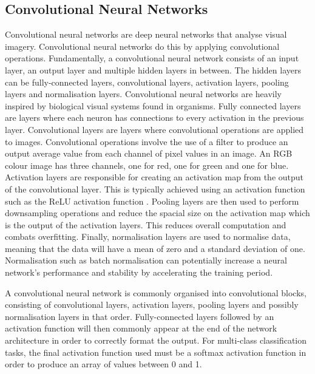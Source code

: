 \documentclass{l4proj}
\begin{document}
\subsection{Convolutional Neural Networks}
Convolutional neural networks are deep neural networks that analyse visual imagery.
Convolutional neural networks do this by applying convolutional operations.
Fundamentally, a convolutional neural network consists of an input layer, an output layer and multiple hidden layers in between.
The hidden layers can be fully-connected layers, convolutional layers, activation layers, pooling layers and normalisation layers.
Convolutional neural networks are heavily inspired by biological visual systems found in organisms.
Fully connected layers are layers where each neuron has connections to every activation in the previous layer.
Convolutional layers are layers where convolutional operations are applied to images.
Convolutional operations involve the use of a filter to produce an output average value from each channel of pixel values in an image.
An RGB colour image has three channels, one for red, one for green and one for blue.
Activation layers are responsible for creating an activation map from the output of the convolutional layer.
This is typically achieved using an activation function such as the ReLU activation function \cite{Nair:2010:RLU:3104322.3104425}. 
Pooling layers are then used to perform downsampling operations and reduce the spacial size on the activation map which is the output of the activation layers.
This reduces overall computation and combats overfitting.
Finally, normalisation layers are used to normalise data, meaning that the data will have a mean of zero and a standard deviation of one.
Normalisation such as batch normalisation\cite{Ioffe:2015:BNA:3045118.3045167} can potentially increase a neural network's performance and stability by accelerating the training period.

A convolutional neural network is commonly organised into convolutional blocks, consisting of convolutional layers, activation layers, pooling layers and possibly normalisation layers in that order. 
Fully-connected layers followed by an activation function will then commonly appear at the end of the network architecture in order to correctly format the output.
For multi-class classification tasks, the final activation function used must be a softmax activation function in order to produce an array of values between 0 and 1.
\end{document}
